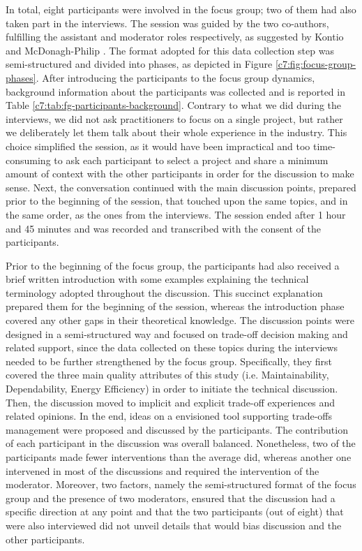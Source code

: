 In total, eight participants were involved in the focus group; two of them had also taken part in the interviews.
The session was guided by the two co-authors, fulfilling the assistant and moderator roles respectively, as suggested by Kontio \cite{Kontio2008} and McDonagh-Philip \cite{Mcdonagh2000}.
The format adopted for this data collection step was semi-structured and divided into phases, as depicted in Figure \ref{c7:fig:focus-group-phases}.
After introducing the participants to the focus group dynamics, background information about the participants was collected and is reported in Table \ref{c7:tab:fg-participants-background}.
Contrary to what we did during the interviews, we did not ask practitioners to focus on a single project, but rather we deliberately let them talk about their whole experience in the industry. This choice simplified the session, as it would have been impractical and too time-consuming to ask each participant to select a project and share a minimum amount of context with the other participants in order for the discussion to make sense.
Next, the conversation continued with the main discussion points, prepared prior to the beginning of the session, that touched upon the same topics, and in the same order, as the ones from the interviews. 
The session ended after 1 hour and 45 minutes and was recorded and transcribed with the consent of the participants.

Prior to the beginning of the focus group, the participants had also received a brief written introduction with some examples explaining the technical terminology adopted throughout the discussion.
This succinct explanation prepared them for the beginning of the session, whereas the introduction phase covered any other gaps in their theoretical knowledge.
The discussion points were designed in a semi-structured way and focused on trade-off decision making and related support, since the data collected on these topics during the interviews needed to be further strengthened by the focus group.
Specifically, they first covered the three main quality attributes of this study (i.e. Maintainability, Dependability, Energy Efficiency) in order to initiate the technical discussion.
Then, the discussion moved to implicit and explicit trade-off experiences and related opinions.
In the end, ideas on a envisioned tool supporting trade-offs management were proposed and discussed by the participants.
The contribution of each participant in the discussion was overall balanced.
Nonetheless, two of the participants made fewer interventions than the average did, whereas another one intervened in most of the discussions and required the intervention of the moderator.
Moreover, two factors, namely the semi-structured format of the focus group and the presence of two moderators, ensured that the discussion had a specific direction at any point and that the two participants (out of eight) that were also interviewed did not unveil details that would bias discussion and the other participants.


